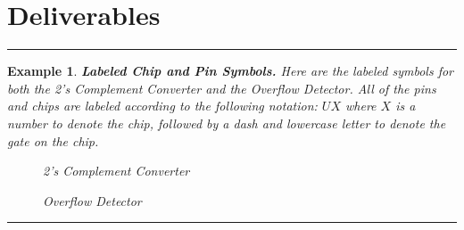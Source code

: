 \documentclass[12pt]{article}
\newtheorem{example}{Example}
\newenvironment{examp}
{\vspace{0.5cm}
\hrule
\begin{example}}
{\hrule
\vspace{0.5cm}
\end{example}}
\begin{document}
\section*{Deliverables}
\begin{examp}
	\textbf{Labeled Chip and Pin Symbols.}
	\newline
	Here are the labeled symbols for both the 2’s Complement Converter and the Overflow Detector. All of the pins and chips are labeled according to the following notation: \(UX\) where \(X\) is a number to denote the chip, followed by a dash and lowercase letter to denote the gate on the chip.
	\newpage
	\begin{figure}[H]
		\caption{2's Complement Converter}
	\end{figure}

	\begin{figure}[H]
		\caption{Overflow Detector}
	\end{figure}
\end{examp}
\end{document}
